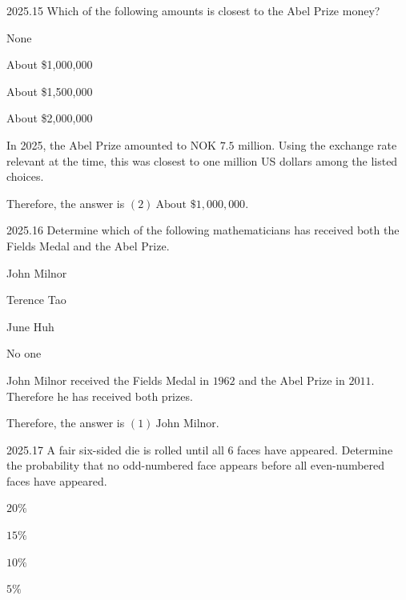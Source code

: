     \begin{pastproblem}{2025.15}
        Which of the following amounts is closest to the Abel Prize money?
        \begin{problemchoices}
            \item None
            \item About \$1{,}000{,}000
            \item About \$1{,}500{,}000
            \item About \$2{,}000{,}000
        \end{problemchoices}
    \end{pastproblem}

    \begin{solution}
        In 2025, the Abel Prize amounted to NOK $7.5$ million. Using the exchange rate relevant at
        the time, this was closest to one million US dollars among the listed choices.

        Therefore, the answer is $\boxed{(2)\ \text{About }\$1{,}000{,}000}$.
    \end{solution}

    \begin{pastproblem}{2025.16}
        Determine which of the following mathematicians has received both the Fields Medal and the
        Abel Prize.
        \begin{problemchoices}
            \item John Milnor
            \item Terence Tao
            \item June Huh
            \item No one
        \end{problemchoices}
    \end{pastproblem}

    \begin{solution}
        John Milnor received the Fields Medal in $1962$ and the Abel Prize in $2011$. Therefore he
        has received both prizes.

        Therefore, the answer is $\boxed{(1)\ \text{John Milnor}}$.
    \end{solution}

    \begin{pastproblem}{2025.17}
        A fair six-sided die is rolled until all $6$ faces have appeared. Determine the probability
        that no odd-numbered face appears before all even-numbered faces have appeared.
        \begin{problemchoices}
            \item \(20\%\)
            \item \(15\%\)
            \item \(10\%\)
            \item \(5\%\)
        \end{problemchoices}
    \end{pastproblem}

